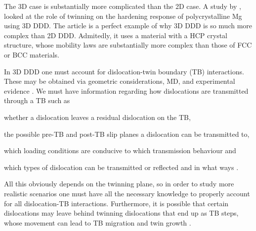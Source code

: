 The 3D case is substantially more complicated than the 2D case. A study by \citet{twinning}, looked at the role of twinning on the hardening response of polycrystalline Mg using 3D DDD. The article is a perfect example of why 3D DDD is so much more complex than 2D DDD. Admitedly, it uses a material with a HCP crystal structure, whose mobility laws are substantially more complex than those of FCC or BCC materials.

In 3D DDD one must account for dislocation-twin boundary (TB) interactions. These may be obtained via geometric considerations, MD, and experimental evidence \cite{twinning2,twinning3,twinning4,twinning5}. We must have information regarding how dislocations are transmitted through a TB such as
\begin{inparaenum}[\itshape 1\upshape)]
    \item whether a dislocation leaves a residual dislocation on the TB,
    \item the possible pre-TB and post-TB slip planes a dislocation can be transmitted to,
    \item which loading conditions are conducive to which transmission behaviour and
    \item which types of dislocation can be transmitted or reflected and in what ways \cite{twinning}.
\end{inparaenum}
All this obviously depends on the twinning plane, so in order to study more realistic scenarios one must have all the necessary knowledge to properly account for all dislocation-TB interactions. Furthermore, it is possible that certain dislocations may leave behind twinning dislocations that end up as TB steps, whose movement can lead to TB migration and twin growth \cite{twinning6, twinning7}.

